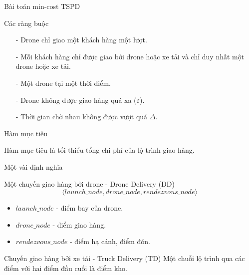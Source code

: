 \documentclass[compress]{beamer}
\begin{document}
\begin{frame}{Bài toán min-cost TSPD}


\begin{block}{Các ràng buộc}
\begin{itemize}

\item[-] Drone chỉ giao một khách hàng một lượt.
\item[-] Mỗi khách hàng chỉ được giao bởi drone hoặc xe tải và chỉ duy nhất một drone hoặc xe tải.
\item[-] Một drone tại một thời điểm.
\item[-] Drone không được giao hàng quá xa ($\varepsilon$).
\item[-] Thời gian chờ nhau không được vượt quá $\Delta$.


\end{itemize}
\end{block}

\begin{block}{Hàm mục tiêu}

Hàm mục tiêu là tối thiểu tổng chi phí của lộ trình giao hàng.
\end{block}
\end{frame}
\begin{frame}{Một vài định nghĩa}
\begin{block}{Một chuyến giao hàng bởi drone - Drone Delivery (DD)}
$$\langle launch\_node, drone\_node, rendezvous\_node \rangle$$
\begin{itemize}
\item $launch\_node$ - điểm bay của drone.
\item $drone\_node$ - điểm giao hàng.
\item $rendezvous\_node$ - điểm hạ cánh, điểm đón.
\end{itemize}
\end{block}
\begin{block}{Chuyến giao hàng bởi xe tải - Truck Delivery (TD)}
Một chuỗi lộ trình qua các điểm với hai điểm đầu cuối là điểm kho. 

\end{block}
\end{frame}
\end{document}
